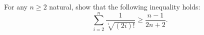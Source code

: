 For any $ n\ge 2 $ natural, show that the following inequality holds:
$$ \sum_{i=2}^n\frac{1}{\sqrt[i]{(2i)!}}\ge\frac{n-1}{2n+2} . $$